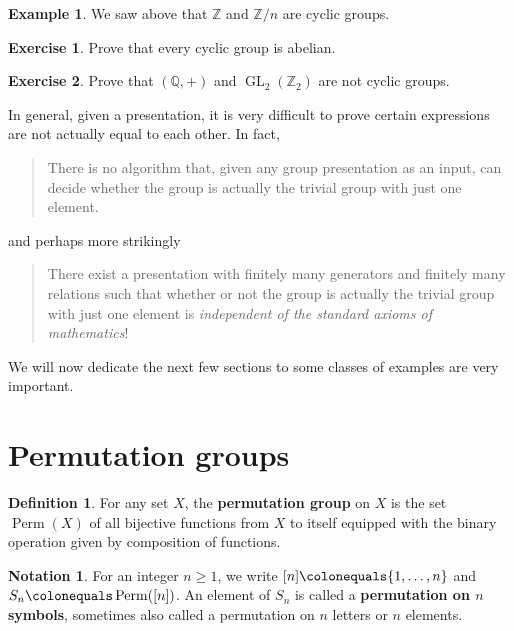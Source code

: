 \documentclass[12pt]{report}
\numberwithin{equation}{section}
\numberwithin{theorem}{chapter}
\theoremstyle{definition}
\newtheorem{definition}[theorem]{Definition}
\newtheorem{example}[theorem]{Example}
\newtheorem{exercise}{Exercise}
\newtheorem*{basic properties}{Basic Properties}
\newtheorem*{Important Remark}{Important Remark}
\newtheorem{notation}[theorem]{Notation}
\newcommand{\df}[1]{{\bf #1}\index{#1}}
\DeclareMathOperator{\Perm}{Perm}
\newcommand{\Z}{\mathbb{Z}}
\begin{document}
\begin{example}
	We saw above that $\Z$ and $\Z/n$ are cyclic groups.
\end{example}

\begin{exercise}
Prove that every cyclic group is abelian. 
\end{exercise}


\begin{exercise}
 Prove that $(\mathbb Q, +)$ and $\operatorname{GL}_2(\mathbb Z_2)$ are not cyclic groups.
\end{exercise}



In general, given a presentation, it is very difficult to prove certain expressions are not actually equal to each other. In fact,
\begin{quote}
There is no algorithm that, given any group presentation as an input, can decide whether the group is actually the trivial group with just one element.
\end{quote}
and perhaps more strikingly
\begin{quote}
There exist a presentation with finitely many generators and finitely many relations such that whether or not the group is actually the trivial group with just one element is {\em independent of the standard axioms of mathematics}!
\end{quote}










\vspace{2em}

We will now dedicate the next few sections to some classes of examples are very important.





\section{Permutation groups}


\begin{definition}
For any set $X$, the {\bf permutation group}  on $X$ is the set $\Perm(X)$ of all bijective functions from $X$ to itself equipped with the binary operation given by composition of functions.
\end{definition}

\begin{notation}\index{$[n]$}
For an integer $n \geqslant 1$, we write $[n] \colonequals \{1,\ldots,n\}$ and $S_n \colonequals \Perm([n])$. An element of $S_n$ is called a \df{permutation on $n$ symbols}, sometimes also called a permutation on $n$ letters or $n$ elements. 
\end{notation}
\end{document}
